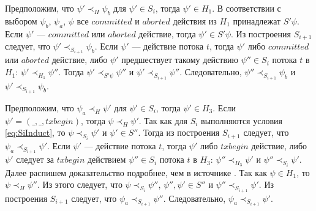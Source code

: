 \begin{myproof}
\begin{itemize}[listparindent=1.5em]
Предположим, что $\psi' \prec_{H} \psi_b$ для $\psi' \in S_i$, тогда $\psi' \in H_1$. В соответствии с выбором $\psi_b$, $\psi_a$, $\psi$ все $committed$ и $aborted$ действия из $H_1$ принадлежат $S'\psi$. Если $\psi'$ --- $committed$ или $aborted$ действие, тогда $\psi' \in S'\psi$. Из построения $S_{i+1}$ следует, что $\psi' \prec_{S_{i+1}} \psi_b$. Если $\psi'$ --- действие потока $t$, тогда $\psi'$ либо $committed$ или $aborted$ действие, либо $\psi'$ предшествует такому действию $\psi'' \in S_i$ потока $t$ в $H_1$: $\psi' \prec_{H_1} \psi''$. Тогда $\psi' \prec_{S'\psi} \psi''$ и $\psi' \prec_{S_{i+1}} \psi''$. Следовательно, $\psi'' \prec_{S_{i+1}} \psi_b$ и $\psi' \prec_{S_{i+1}} \psi_b$. 

Предположим, что $\psi_a \prec_{H} \psi'$ для $\psi' \in S_i$, тогда $\psi' \in H_3$. Если $\psi' = (\_,\_, txbegin)$, тогда $\psi \prec_{H} \psi'$. Так как для $S_i$ выполняются условия \eqref{eq:SiInduct}, то $\psi \prec_{S_i} \psi'$ и $\psi' \in S''$. Тогда из построения $S_{i+1}$ следует, что $\psi_a \prec_{S_{i+1}} \psi'$. Если $\psi'$ --- действие потока $t$, тогда $\psi'$ либо $txbegin$ действие, либо $\psi'$ следует за $txbegin$ действием $\psi'' \in S_i$ потока $t$ в $H_3$: $\psi'' \prec_{H_3} \psi'$ и $\psi'' \prec_{S_i} \psi'$. Далее распишем доказательство подробнее, чем в источнике \cite{tms_article}. Так как $\psi \in H_1$, то $\psi \prec_H \psi''$. Из этого следует, что $\psi \prec_{S_i} \psi''$, $\psi'', \psi' \in S''$ и $\psi'' \prec_{S_{i+1}} \psi'$. Из построения $S_{i+1}$ следует, что $\psi_a \prec_{S_{i+1}} \psi''$. Следовательно, $\psi_a \prec_{S_{i+1}} \psi'$. 
\end{itemize}
\end{myproof}


